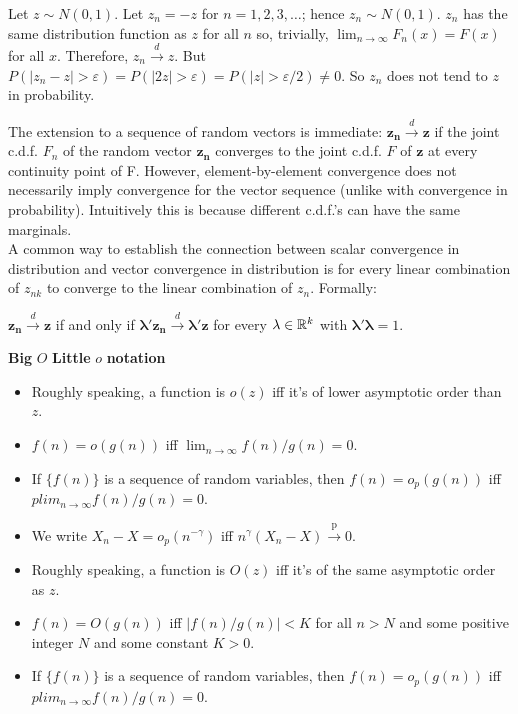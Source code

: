 \documentclass[DIV=14,titlepage=false]{scrreprt}
\begin{document}
\begin{example}
    Let \( z \sim N(0,1) \). Let \( z_n = -z \) for \( n = 1,2,3,\ldots \); hence \( z_n \sim N(0,1) \).
    \( z_n \) has the same distribution function as \( z \) for all \( n \) so, trivially, \( \lim_{n \to \infty} F_n(x) = F(x) \) for all \( x \).
    Therefore, \( z_n \overset{d}{\to} z \). But \( P(|z_n - z| > \varepsilon) = P(|2z| > \varepsilon) = P(|z| > \varepsilon/2) \neq 0 \).
    So \( z_n \) does not tend to \( z \) in probability.
\end{example}

The extension to a sequence of random vectors is immediate: $\mathbf{z_n} \overset{d}{\to} \mathbf{z}$ if the joint c.d.f. $F_n$ of the random vector {$\mathbf{z_n}$} converges to the joint c.d.f. $F$ of {$\mathbf{z}$} at every continuity point of F. However, element-by-element convergence does not necessarily imply convergence for the vector sequence (unlike with convergence in probability). Intuitively this is because different c.d.f.'s can have the same marginals.\\
A common way to establish the connection between scalar convergence in distribution and vector convergence in distribution is for every linear combination of $z_{nk}$ to converge to the linear combination of $z_n$. Formally:

\begin{definition}
    $\mathbf{z_n} \overset{d}{\to} \mathbf{z}$ if and only if $\mathbf{\lambda ' z_n} \overset{d}{\to} \mathbf{\lambda ' z}$ for every $\mathbf{\lambda} \in \mathbb{R}^k$ with $\mathbf{\lambda'\lambda}=1$. 
\end{definition}

\begin{note}
    \textbf{Big} $O$ \textbf{Little} $o$ \textbf{notation}
    \begin{itemize}
        \item Roughly speaking, a function is $ o(z) $ iff it's of lower asymptotic order than $ z $.
        \item $ f(n) = o(g(n)) $ iff $ \lim_{n \to \infty} f(n) / g(n) = 0 $. 
        \item If $ \{ f(n) \} $ is a sequence of random variables, then $ f(n) = o_p (g(n)) $ iff $ plim_{n \to \infty} f(n) / g(n) = 0 $.
        \item  We write $ X_n - X = o_p (n^{- \gamma}) $ iff $ n^{\gamma}(X_n - X) \xrightarrow{\text{p}} 0 $.
        \vspace{20pt}
        \item Roughly speaking, a function is $ O(z) $ iff it's of the same asymptotic order as $ z $.
        \item $ f(n) = O(g(n)) $ iff $ | f(n) / g(n) | < K $ for all $ n > N $ and some positive integer $ N $ and some constant $ K >0 $. 
        \item If $ \{ f(n) \} $ is a sequence of random variables, then $ f(n) = o_p (g(n)) $ iff $ plim_{n \to \infty} f(n) / g(n) = 0 $.
    \end{itemize}
\end{note}
\end{document}
